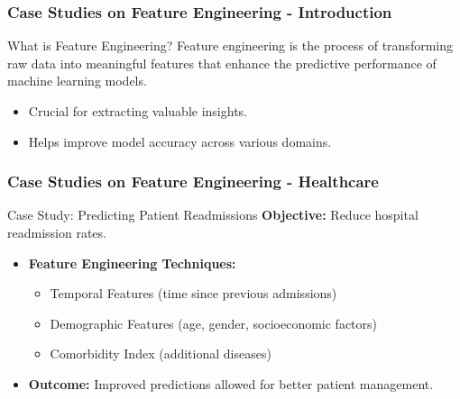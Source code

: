 \documentclass[aspectratio=169]{beamer}
\begin{document}
\begin{frame}[fragile]
    \frametitle{Case Studies on Feature Engineering - Introduction}
    \begin{block}{What is Feature Engineering?}
        Feature engineering is the process of transforming raw data into meaningful features that enhance the predictive performance of machine learning models.
    \end{block}
    \begin{itemize}
        \item Crucial for extracting valuable insights.
        \item Helps improve model accuracy across various domains.
    \end{itemize}
\end{frame}

\begin{frame}[fragile]
    \frametitle{Case Studies on Feature Engineering - Healthcare}
    \begin{block}{Case Study: Predicting Patient Readmissions}
        \textbf{Objective:} Reduce hospital readmission rates.
    \end{block}
    \begin{itemize}
        \item \textbf{Feature Engineering Techniques:}
            \begin{itemize}
                \item Temporal Features (time since previous admissions)
                \item Demographic Features (age, gender, socioeconomic factors)
                \item Comorbidity Index (additional diseases)
            \end{itemize}
        \item \textbf{Outcome:} Improved predictions allowed for better patient management.
    \end{itemize}
\end{frame}
\end{document}
